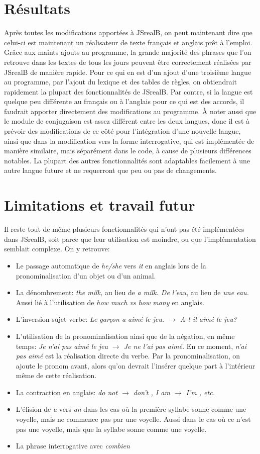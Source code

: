 \documentclass[11pt]{article} %
\newcommand{\system}[1]{\textsf{#1}}
\newcommand{\JSB}{\system{JSrealB}}
\begin{document}
\section{Résultats}
Après toutes les modifications apportées à \JSB{}, on peut maintenant
dire que celui-ci est maintenant un réalisateur de texte français et anglais
prêt à l'emploi. Grâce aux maints ajouts au programme, la grande majorité
des phrases que l'on retrouve dans les textes de tous les jours peuvent
être correctement réalisées par \JSB{} de manière rapide. Pour ce
qui en est d'un ajout d'une troisième langue au programme, par l'ajout
du lexique et des tables de règles, on obtiendrait rapidement la plupart
des fonctionnalités de \JSB{}. Par contre, si la langue est quelque
peu différente au français ou à l'anglais pour ce qui est des accords,
il faudrait apporter directement des modifications au programme. À
noter aussi que le module de conjugaison est assez différent entre
les deux langues, donc il est à prévoir des modifications de ce côté
pour l'intégration d'une nouvelle langue, ainsi que dans la modification
vers la forme interrogative, qui est implémentée de manière similaire,
mais séparément dans le code, à cause de plusieurs différences notables.
La plupart des autres fonctionnalités sont adaptables facilement à
une autre langue future et ne requerront que peu ou pas de changements.
\section{Limitations et travail futur}
Il reste tout de même plusieurs fonctionnalités qui n'ont pas été
implémentées dans \JSB{}, soit parce que leur utilisation est moindre,
ou que l'implémentation semblait complexe. On y retrouve:

\begin{itemize}
\item Le passage automatique de \emph{he/she} vers \emph{it} en anglais
lors de la pronominalisation d'un objet ou d'un animal.
\item La dénombrement: \emph{the milk, }au lieu de \emph{a milk. De l'eau},
au lieu de \emph{une eau. }Aussi lié à l'utilisation de \emph{how much
vs how many }en anglais.
\item L'inversion sujet-verbe: \emph{Le garçon a aimé le jeu. $\rightarrow$ A-t-il
aimé le jeu?}
\item L'utilisation de la pronominalisation ainsi que de la négation, en
même temps: \emph{Je n'ai pas aimé le jeu $\rightarrow$ Je ne l'ai pas aimé.
}En ce moment, \emph{n'ai pas aimé} est la réalisation directe du
verbe. Par la pronominalisation, on ajoute le pronom avant, alors
qu'on devrait l'insérer quelque part à l'intérieur même de cette réalisation.
\item La contraction en anglais: \emph{do not $\rightarrow$ don't , I am $\rightarrow$ I'm , etc.}
\item L'élision de \emph{a} vers \emph{an} dans les cas où la première syllabe sonne comme une voyelle,
mais ne commence pas par une voyelle. Aussi dans le cas où ce n'est pas une voyelle, mais que la syllabe
sonne comme une voyelle.
\item La phrase interrogative avec \emph{combien}
\end{itemize}
\end{document}

